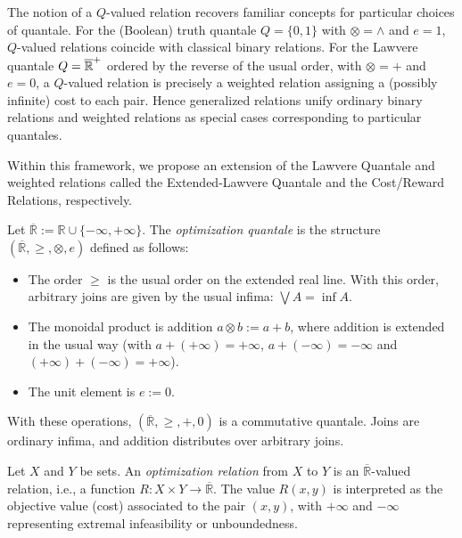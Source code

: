 The notion of a $Q$-valued relation recovers familiar concepts for particular choices of quantale. For the (Boolean) truth quantale $Q = \{0,1\}$ with $\otimes = \land$ and $e = 1$, $Q$-valued relations coincide with classical binary relations. For the Lawvere quantale $Q = \overline{\mathbb{R}}^+$ ordered by the reverse of the usual order, with $\otimes = +$ and $e = 0$, a $Q$-valued relation is precisely a weighted relation assigning a (possibly infinite) cost to each pair. Hence generalized relations unify ordinary binary relations and weighted relations as special cases corresponding to particular quantales.

Within this framework, we propose an extension of the Lawvere Quantale and
weighted relations called the Extended-Lawvere Quantale and
the Cost/Reward Relations, respectively.

\begin{definition}
	Let $\overline{\mathbb{R}} := \mathbb{R} \cup \{-\infty,+\infty\}$.
	The \emph{optimization quantale} is the structure $(\overline{\mathbb{R}},\geq,\otimes,e)$
	defined as follows:
	\begin{itemize}
		\item The order $\geq$ is the usual order on the extended real line.
		      With this order, arbitrary joins are given by the usual infima: $\bigvee A = \inf A$.
		\item The monoidal product is addition $a \otimes b := a + b$,
		      where addition is extended in the usual way
		      (with $a + (+\infty) = +\infty$, $a + (-\infty) = -\infty$ and $(+\infty) + (-\infty) = + \infty$).
		\item The unit element is $e := 0$.
	\end{itemize}
	With these operations, $(\overline{\mathbb{R}},\geq,+,0)$
	is a commutative quantale. Joins are ordinary infima,
	and addition distributes over arbitrary joins.
\end{definition}

\begin{definition}
	Let $X$ and $Y$ be sets.
	An \emph{optimization relation} from $X$ to $Y$ is an
	$\overline{\mathbb{R}}$-valued relation, i.e., a function
	$R : X \times Y \to \overline{\mathbb{R}}$.
	The value $R(x,y)$ is interpreted as the objective value
    (cost) associated to the pair $(x,y)$,
	with $+\infty$ and $-\infty$ representing extremal infeasibility
	or unboundedness.
\end{definition}

